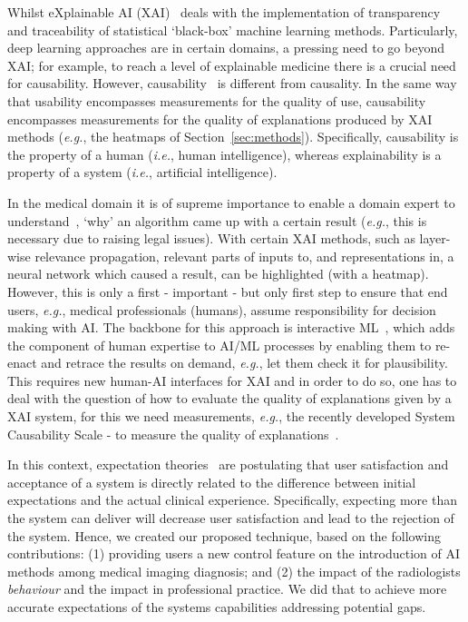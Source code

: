 Whilst eXplainable AI (XAI)~\cite{10.5555/3365202} deals with the implementation of transparency and traceability of statistical `black‐box' machine learning methods.
Particularly, deep learning approaches are in certain domains, a pressing need to go beyond XAI; for example, to reach a level of explainable medicine there is a crucial need for causability.
However, causability~\cite{https://doi.org/10.1002/widm.1312} is different from causality.
In the same way that usability encompasses measurements for the quality of use, causability encompasses measurements for the quality of explanations produced by XAI methods ({\it e.g.}, the heatmaps of Section~\ref{sec:methods}).
Specifically, causability is the property of a human ({\it i.e.}, human intelligence), whereas explainability is a property of a system ({\it i.e.}, artificial intelligence).

In the medical domain it is of supreme importance to enable a domain expert to understand~\cite{yang2019profiling}, `why' an algorithm came up with a certain result ({\it e.g.}, this is necessary due to raising legal issues).
With certain XAI methods, such as layer-wise relevance propagation, relevant parts of inputs to, and representations in, a neural network which caused a result, can be highlighted (with a heatmap).
However, this is only a first - important - but only first step to ensure that end users, {\it e.g.}, medical professionals (humans), assume responsibility for decision making with AI.
The backbone for this approach is interactive ML~\cite{holzinger2016interactive}, which adds the component of human expertise to AI/ML processes by enabling them to re-enact and retrace the results on demand, {\it e.g.}, let them check it for plausibility.
This requires new human-AI interfaces for XAI and in order to do so, one has to deal with the question of how to evaluate the quality of explanations given by a XAI system, for this we need measurements, {\it e.g.}, the recently developed System Causability Scale - to measure the quality of explanations~\cite{andreas2020measuring}.

In this context, expectation theories~\cite{Kocielnik:2019:YAI:3290605.3300641, leung2019health} are postulating that user satisfaction and acceptance of a system is directly related to the difference between initial expectations and the actual clinical experience.
Specifically, expecting more than the system can deliver will decrease user satisfaction and lead to the rejection of the system.
Hence, we created our proposed technique, based on the following contributions:
(1) providing users a new control feature on the introduction of AI methods among medical imaging diagnosis; and
(2) the impact of the radiologists {\it behaviour} and the impact in professional practice.
We did that to achieve more accurate expectations of the systems capabilities addressing potential gaps.